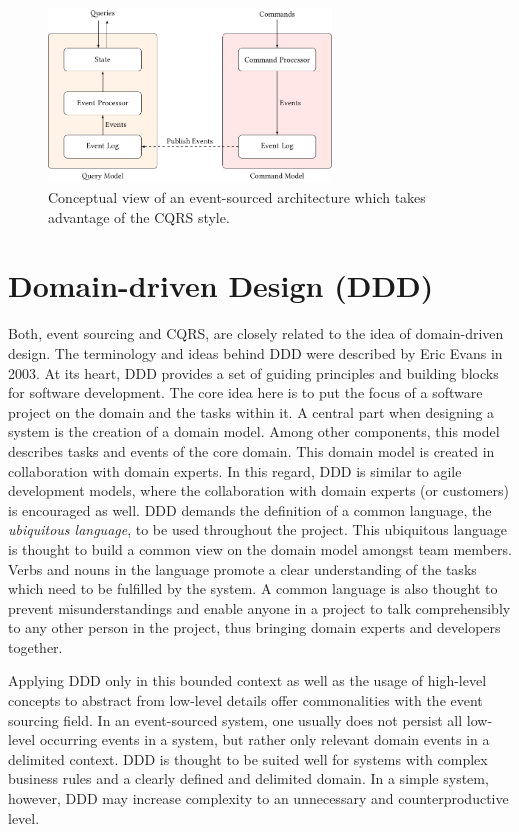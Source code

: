 \begin{figure}[h!]
	\centering
	\includegraphics[width=0.67\textwidth]
		{../illustrations/processors.pdf}

	\caption{
		Conceptual view of an event-sourced architecture which takes 
		advantage of the CQRS style.
	}
	\label{fig:conceptes}
\end{figure}

\section{Domain-driven Design (DDD)}
Both, event sourcing and CQRS, are closely related to the idea of domain-driven 
design. The terminology and ideas behind DDD were described by Eric Evans 
\cite{Evans2003} in 2003. At its heart, DDD provides a set of guiding principles 
and building blocks for software development. The core idea here is to put the 
focus of a software project on the domain and the tasks within it. A central part 
when designing a system is the creation of a domain model. Among other components,
this model describes tasks and events of the core domain.
This domain model is created in collaboration with domain experts. In this regard, 
DDD is similar to agile development models, where the collaboration with domain 
experts (or customers) is encouraged as well. 
DDD demands the definition of a common language, the \emph{ubiquitous language}, 
to be used throughout the project. This ubiquitous language is thought to build 
a common view on the domain model amongst team members. Verbs and nouns in the 
language promote a clear understanding of the tasks which need to be fulfilled 
by the system. 
A common language is also thought to prevent misunderstandings and enable anyone 
in a project to talk comprehensibly to any other person in the project, thus 
bringing domain experts and developers together. 

Applying DDD only in this bounded context as well as the usage of high-level 
concepts to abstract from low-level details offer commonalities with the event 
sourcing field.
In an event-sourced system, one usually does not persist all low-level occurring 
events in a system, but rather only relevant domain events in a delimited context. 
DDD is thought to be suited well for systems with complex business rules and a
clearly defined and delimited domain. 
In a simple system, however, DDD may increase complexity to an unnecessary and 
counterproductive level.

